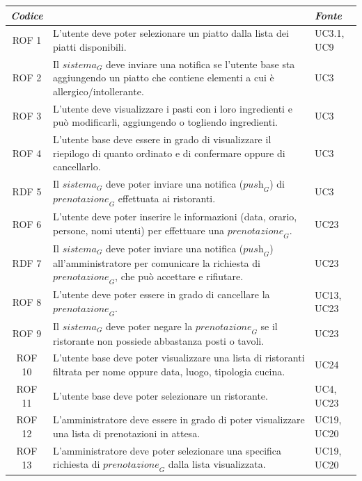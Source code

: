 \documentclass[12pt, oneside]{article}
\begin{document}
\begin{longtable}{|c|p{14cm}|p{2cm}|}
    \hline
    \emph{Codice} & \centering{\emph{Descrizione}} &  \emph{Fonte} \\
    \hline
    \endfirsthead
    \endhead

    ROF 1&  L'utente deve poter selezionare un piatto dalla lista dei piatti disponibili.  & UC3.1, UC9  \\
    \hline
    ROF 2& Il $\textit{sistema}_G$ deve inviare una notifica se l'utente base sta aggiungendo un piatto che contiene elementi a cui è allergico/intollerante. & UC3\\
    \hline
    ROF 3& L'utente deve visualizzare i pasti con i loro ingredienti e può modificarli, aggiungendo o togliendo ingredienti. & UC3\\
    \hline
    ROF 4& L'utente base deve essere in grado di visualizzare il riepilogo di quanto ordinato e di confermare oppure di cancellarlo. & UC3 \\
    \hline
    RDF 5& Il $\textit{sistema}_G$ deve poter inviare una notifica ($\textit{push}_G$) di $\textit{prenotazione}_G$ effettuata ai ristoranti.& UC3 \\
    \hline
    ROF 6& L'utente deve poter inserire le informazioni (data, orario, persone, nomi utenti) per effettuare una $\textit{prenotazione}_G$. & UC23\\
    \hline
    RDF 7& Il $\textit{sistema}_G$ deve poter inviare una notifica ($\textit{push}_G$) all'amministratore per comunicare la richiesta di $\textit{prenotazione}_G$, che può accettare e rifiutare. & UC23\\
    \hline
    ROF 8& L'utente deve poter essere in grado di cancellare la $\textit{prenotazione}_G$. & UC13, UC23 \\
    \hline
    ROF 9& Il $\textit{sistema}_G$ deve poter negare la $\textit{prenotazione}_G$ se il ristorante non possiede abbastanza posti o tavoli. & UC23 \\
    \hline
    ROF 10& L'utente base deve poter visualizzare una lista di ristoranti filtrata per nome oppure data, luogo, tipologia cucina. & UC24 \\
    \hline
    ROF 11& L'utente base deve poter selezionare un ristorante.  & UC4, UC23 \\
    \hline
    ROF 12& L'amministratore deve essere in grado di poter visualizzare una lista di prenotazioni in attesa. & UC19, UC20 \\
    \hline
    ROF 13& L'amministratore deve poter selezionare una specifica richiesta di $\textit{prenotazione}_G$ dalla lista visualizzata. & UC19, UC20 \\

\end{longtable}
\end{document}

